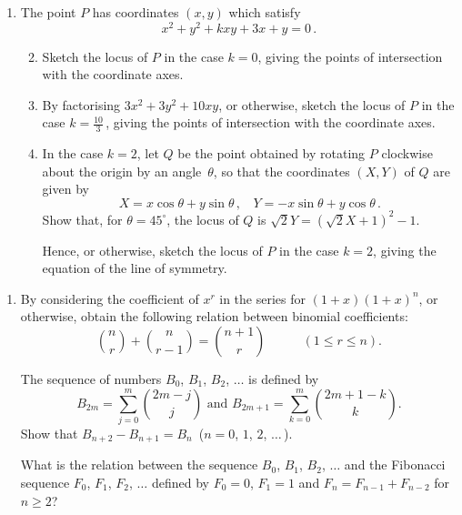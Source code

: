 \documentclass[a4, 11pt]{report}
\newlength{\qspace}
\newcounter{qnumber}
\newenvironment{question}%
 {\vspace{\qspace}
  \begin{enumerate}[\bfseries 1\quad][10]%
    \setcounter{enumi}{\value{qnumber}}%
    \item%
 }
{
  \end{enumerate}
  \filbreak
  \stepcounter{qnumber}
 }
\newenvironment{questionparts}[1][1]%
 {
  \begin{enumerate}[\bfseries (i)]%
    \setcounter{enumii}{#1}
    \addtocounter{enumii}{-1}
    \setlength{\itemsep}{5mm}
    \setlength{\parskip}{8pt}
 }
 {
  \end{enumerate}
 }
\def\le{\leqslant}
\def\ge{\geqslant}
\begin{document}
\begin{question}
The point $P$ has coordinates $(x,y)$ which satisfy
\[
x^2+y^2 + kxy +3x +y =0\,.
\]
\vspace*{-8mm}
\begin{questionparts}
\item
Sketch the locus of $P$ in the case $k=0$, giving the points of 
intersection with the coordinate axes.
\item By factorising $3x^2 +3y^2 +10xy$, or otherwise,
 sketch the locus of $P$ in the case $k=\frac{10}{3}\,$,
 giving the points of 
intersection with the coordinate axes.

\item In the case $k=2$, 
let $Q$ be the point obtained by rotating $P$ 
clockwise about the origin 
by an angle~$\theta$, so that the coordinates $(X,Y)$
of $Q$
are given by 
\[
X=x\cos\theta +y\sin\theta\,, \ \ \  \ Y= -x\sin\theta + y\cos\theta\,.
\]
Show that, for $\theta =45^\circ$, 
the locus of $Q$  is 
$ 
\sqrt2 Y=   (\sqrt2 X+1  )^2 - 1 .
$ 

Hence, or otherwise, sketch the locus of $P$ in the case $k=2$, 
giving the equation of the 
line of symmetry.
\end{questionparts}
\end{question}
	
\begin{question}
By considering the coefficient of $x^r$ in the series for $(1+x)(1+x)^n$,
or otherwise, obtain the following relation between binomial coefficients:
\[
\binom n r + \binom n {r-1} = \binom {n+1} r
\ \ \ \ \ \ \ \ \ \ \ \ \ (1\le r\le n).
\]

The sequence of numbers $B_0$, $B_1$, $B_2$, $\ldots$ is defined by
\[
B_{2m} = \sum_{j=0}^m \binom{2m-j}j 
\text{ \ \ \ \ \ and \ \ \ \ \ }
B_{2m+1} = \sum_{k=0}^m \binom{2m+1-k}k 
.
\]
Show that $B_{n+2} - B_{n+1} = B_{n}\,$ ($n=0$, $1$, $2$, $\ldots\,$).

What is the relation between the sequence $B_0$,   $B_1$, $B_2$, $\ldots$ 
and the Fibonacci sequence  $F_0$, $F_1$, $F_2$, $\ldots$  defined by $F_0=0$,
$F_1=1$ and $F_n = F_{n-1}+F_{n-2}$ for $n\ge2$?
\end{question}
	
\end{document}
